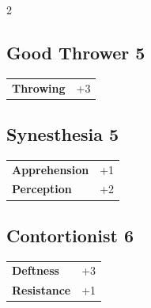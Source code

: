 \begin{multicols}{2}
\begin{tcolorbox}
    \subsection*{Good Thrower \hfill \small{5 }}
    \tcblower




\begin{tabular}{@{}ll@{}}
    \textbf{Throwing} & +3\\
\end{tabular}


\end{tcolorbox}

\begin{tcolorbox}
    \subsection*{Synesthesia \hfill \small{5 }}
    \tcblower




\begin{tabular}{@{}ll@{}}
    \textbf{Apprehension} & +1\\
    \textbf{Perception} & +2\\
\end{tabular}


\end{tcolorbox}

\begin{tcolorbox}
    \subsection*{Contortionist \hfill \small{6 }}
    \tcblower




\begin{tabular}{@{}ll@{}}
    \textbf{Deftness} & +3\\
    \textbf{Resistance} & +1\\
\end{tabular}



\end{tcolorbox}
\end{multicols}
